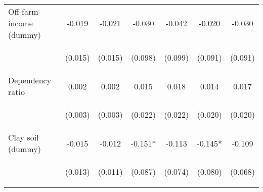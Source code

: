 \begin{center}
\begin{tabular}{lcccccc}
Off-farm income (dummy) & -0.019 & -0.021 & -0.030 & -0.042 & -0.020 & -0.030 \\
\vspace{4pt} & \begin{footnotesize}(0.015)\end{footnotesize} & \begin{footnotesize}(0.015)\end{footnotesize} & \begin{footnotesize}(0.098)\end{footnotesize} & \begin{footnotesize}(0.099)\end{footnotesize} & \begin{footnotesize}(0.091)\end{footnotesize} & \begin{footnotesize}(0.091)\end{footnotesize} \\
Dependency ratio & 0.002 & 0.002 & 0.015 & 0.018 & 0.014 & 0.017 \\
\vspace{4pt} & \begin{footnotesize}(0.003)\end{footnotesize} & \begin{footnotesize}(0.003)\end{footnotesize} & \begin{footnotesize}(0.022)\end{footnotesize} & \begin{footnotesize}(0.022)\end{footnotesize} & \begin{footnotesize}(0.020)\end{footnotesize} & \begin{footnotesize}(0.020)\end{footnotesize} \\
Clay soil (dummy) & -0.015 & -0.012 & -0.151* & -0.113 & -0.145* & -0.109 \\
\vspace{4pt} & \begin{footnotesize}(0.013)\end{footnotesize} & \begin{footnotesize}(0.011)\end{footnotesize} & \begin{footnotesize}(0.087)\end{footnotesize} & \begin{footnotesize}(0.074)\end{footnotesize} & \begin{footnotesize}(0.080)\end{footnotesize} & \begin{footnotesize}(0.068)\end{footnotesize} \\

\end{tabular}
\end{center}
